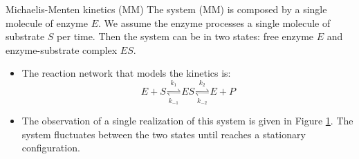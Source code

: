 \documentclass[final]{beamer}
\newlength{\colwidth}
\begin{document}
\begin{frame}[t]
\begin{columns}[t]
\begin{column}{\colwidth}
\begin{alertblock}{Michaelis-Menten kinetics (MM)}
The system (MM) is composed by a single molecule of enzyme $E$. We assume the enzyme processes a single molecule of substrate $S$ per time. Then the system can be in two states: free enzyme $E$ and enzyme-substrate complex $ES$.
\begin{itemize}
\item The reaction network that models the kinetics is:
\begin{equation}
E + S \underset{k_{-1}}{\stackrel{k_1}{\rightleftharpoons}} ES \underset{k_{-2}}{\stackrel{k_2}{\rightleftharpoons}} E + P
\end{equation}
\begin{figure}

\caption{}
\label{fig 2-state-graph}
\end{figure}
\item The observation of a single realization of this system is given in Figure \ref{fig 2-state-graph}. The system fluctuates between the two states until reaches a stationary configuration.
\end{itemize}
\end{alertblock}
%
%
%
%


\end{column}
\end{columns}
\end{frame}
\end{document}
